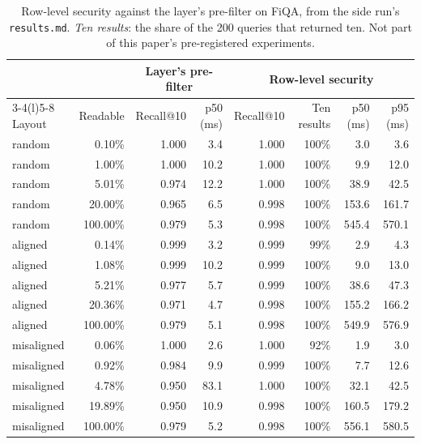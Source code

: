 \begin{table}[tbp]
\centering
\footnotesize
\begin{tabular}{@{}lrrrrrrr@{}}
\toprule
 & & \multicolumn{2}{c}{Layer's pre-filter} & \multicolumn{4}{c}{Row-level security} \\
\cmidrule(lr){3-4}\cmidrule(l){5-8}
Layout & Readable & Recall@10 & p50 (ms) & Recall@10 & Ten results & p50 (ms) & p95 (ms) \\
\midrule
random & 0.10\% & 1.000 & 3.4 & 1.000 & 100\% & 3.0 & 3.6 \\
random & 1.00\% & 1.000 & 10.2 & 1.000 & 100\% & 9.9 & 12.0 \\
random & 5.01\% & 0.974 & 12.2 & 1.000 & 100\% & 38.9 & 42.5 \\
random & 20.00\% & 0.965 & 6.5 & 0.998 & 100\% & 153.6 & 161.7 \\
random & 100.00\% & 0.979 & 5.3 & 0.998 & 100\% & 545.4 & 570.1 \\
aligned & 0.14\% & 0.999 & 3.2 & 0.999 & 99\% & 2.9 & 4.3 \\
aligned & 1.08\% & 0.999 & 10.2 & 0.999 & 100\% & 9.0 & 13.0 \\
aligned & 5.21\% & 0.977 & 5.7 & 0.999 & 100\% & 38.6 & 47.3 \\
aligned & 20.36\% & 0.971 & 4.7 & 0.998 & 100\% & 155.2 & 166.2 \\
aligned & 100.00\% & 0.979 & 5.1 & 0.998 & 100\% & 549.9 & 576.9 \\
misaligned & 0.06\% & 1.000 & 2.6 & 1.000 & 92\% & 1.9 & 3.0 \\
misaligned & 0.92\% & 0.984 & 9.9 & 0.999 & 100\% & 7.7 & 12.6 \\
misaligned & 4.78\% & 0.950 & 83.1 & 1.000 & 100\% & 32.1 & 42.5 \\
misaligned & 19.89\% & 0.950 & 10.9 & 0.998 & 100\% & 160.5 & 179.2 \\
misaligned & 100.00\% & 0.979 & 5.2 & 0.998 & 100\% & 556.1 & 580.5 \\
\bottomrule
\end{tabular}
\caption{Row-level security against the layer's pre-filter on FiQA, from the side run's \texttt{results.md}. \emph{Ten results}: the share of the 200 queries that returned ten. Not part of this paper's pre-registered experiments.}
\label{tab:limits-rls}
\end{table}

